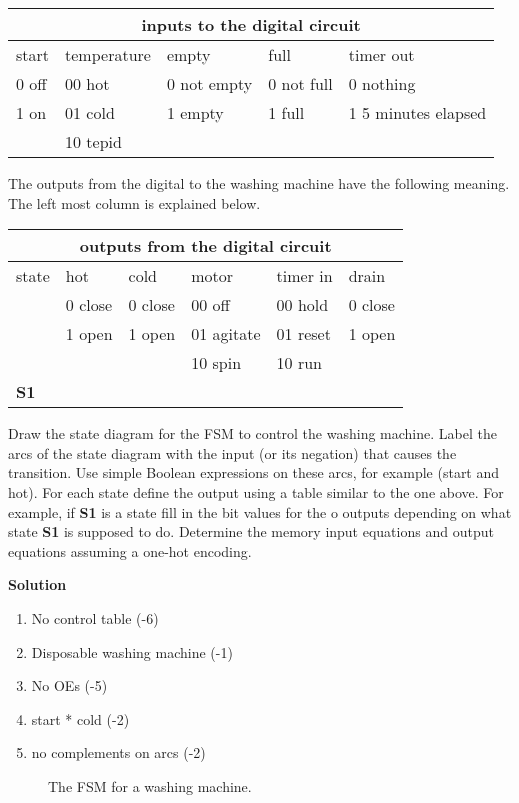 \begin{enumerate}
\begin{tabular}{|l|l|l|l|l|} \hline
\multicolumn{5}{|c|}{inputs to the digital circuit}		\\ \hline \hline
start & temperature & empty       & full       & timer out 	\\ \hline	
0 off & 00 hot      & 0 not empty & 0 not full & 0 nothing	\\ \hline 
1 on  & 01 cold     & 1 empty     & 1 full     & 1 5 minutes elapsed 	\\ \hline 
      & 10 tepid    &		  &	       &		\\ \hline
\end{tabular}

The outputs from the digital to the washing machine have the following meaning.
The left most column is explained below.

\begin{tabular}{|l|||l|l|l|l|l|} \hline
\multicolumn{6}{|c|}{outputs from the digital circuit}			\\ \hline \hline
state & hot     & cold    & motor      & timer in   & drain 	\\ \hline
      & 0 close & 0 close & 00 off     & 00 hold    & 0 close	\\ \hline
      & 1 open  & 1 open  & 01 agitate & 01 reset   & 1 open	\\ \hline
      &		&         & 10 spin    & 10 run     &		\\ \hline \hline
\textbf{ S1}    &	&	  &	       &	    &		\\ \hline
\end{tabular}

Draw the state diagram for the FSM to control the washing machine.  
Label the arcs of the state diagram with the input (or its negation) 
that causes the transition.  Use simple Boolean expressions on these 
arcs, for example (start and hot).
For each state define the output using a table similar to the one above.
For example, if \textbf{ S1} is a state fill in the bit values for the o
outputs depending on what state \textbf{ S1} is supposed to do.
Determine the memory input equations and output equations assuming a one-hot 
encoding.

\begin{onlysolution}  \textbf{Solution} \itshape{
	\begin{enumerate}
	\item No control table (-6)
	\item Disposable washing machine (-1)
	\item No OEs (-5)
	\item start * cold (-2)
	\item no complements on arcs (-2)
	\end{enumerate}
\begin{figure}[ht]
\caption{The FSM for a washing machine.}
\end{figure}

}
\end{onlysolution}
\end{enumerate}
